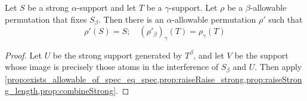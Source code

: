 \begin{proposition}
  \label{prop:exists_allowable_of_fixes}
  Let \( S \) be a strong \( \alpha \)-support and let \( T \) be a \( \gamma \)-support.
  Let \( \rho \) be a \( \beta \)-allowable permutation that fixes \( S_\beta \).
  Then there is an \( \alpha \)-allowable permutation \( \rho' \) such that
  \[ \rho'(S) = S;\quad (\rho'_\beta)_\gamma(T) = \rho_\gamma(T) \]
\end{proposition}
\begin{proof}
  Let \( U \) be the strong support generated by \( T^\beta \), and let \( V \) be the support whose image is precisely those atoms in the interference of \( S_\beta \) and \( U \).
  Then apply \cref{prop:exists_allowable_of_spec_eq_spec,prop:raiseRaise_strong,prop:raiseStrong_length,prop:combineStrong}.
\end{proof}

